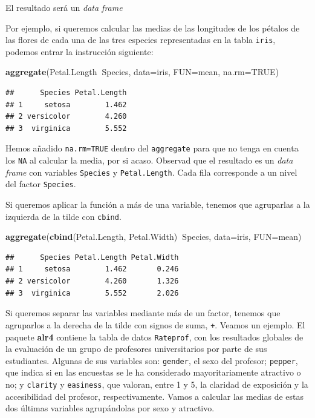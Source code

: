 \documentclass[]{book}
\newenvironment{Shaded}{\begin{snugshade}}{\end{snugshade}}
\newcommand{\DataTypeTok}[1]{\textcolor[rgb]{0.13,0.29,0.53}{#1}}
\newcommand{\KeywordTok}[1]{\textcolor[rgb]{0.13,0.29,0.53}{\textbf{#1}}}
\newcommand{\NormalTok}[1]{#1}
\newcommand{\OperatorTok}[1]{\textcolor[rgb]{0.81,0.36,0.00}{\textbf{#1}}}
\newcommand{\OtherTok}[1]{\textcolor[rgb]{0.56,0.35,0.01}{#1}}
\theoremstyle{definition}
\theoremstyle{definition}
\theoremstyle{definition}
\theoremstyle{remark}
\begin{document}
El resultado será un \emph{data frame}

Por ejemplo, si queremos calcular las medias de las longitudes de los pétalos de las flores de cada una de las tres especies representadas en la tabla \texttt{iris}, podemos entrar la instrucción siguiente:

\begin{Shaded}
\begin{Highlighting}[]
\KeywordTok{aggregate}\NormalTok{(Petal.Length}\OperatorTok{~}\NormalTok{Species, }\DataTypeTok{data=}\NormalTok{iris, }\DataTypeTok{FUN=}\NormalTok{mean, }\DataTypeTok{na.rm=}\OtherTok{TRUE}\NormalTok{)}
\end{Highlighting}
\end{Shaded}

\begin{verbatim}
##      Species Petal.Length
## 1     setosa        1.462
## 2 versicolor        4.260
## 3  virginica        5.552
\end{verbatim}

Hemos añadido \texttt{na.rm=TRUE} dentro del \texttt{aggregate} para que no tenga en cuenta los \texttt{NA} al calcular la media, por si acaso. Observad que el resultado es un \emph{data frame} con variables \texttt{Species} y \texttt{Petal.Length}. Cada fila corresponde a un nivel del factor \texttt{Species}.

Si queremos aplicar la función a más de una variable, tenemos que agruparlas a la izquierda de la tilde con \texttt{cbind}.

\begin{Shaded}
\begin{Highlighting}[]
\KeywordTok{aggregate}\NormalTok{(}\KeywordTok{cbind}\NormalTok{(Petal.Length, Petal.Width)}\OperatorTok{~}\NormalTok{Species, }\DataTypeTok{data=}\NormalTok{iris, }\DataTypeTok{FUN=}\NormalTok{mean)}
\end{Highlighting}
\end{Shaded}

\begin{verbatim}
##      Species Petal.Length Petal.Width
## 1     setosa        1.462       0.246
## 2 versicolor        4.260       1.326
## 3  virginica        5.552       2.026
\end{verbatim}

Si queremos separar las variables mediante más de un factor, tenemos que agruparlos a la derecha de la tilde con signos de suma, \texttt{+}. Veamos un ejemplo. El paquete \textbf{alr4} contiene la tabla de datos \texttt{Rateprof}, con los resultados globales de la evaluación de un grupo de profesores universitarios por parte de sus estudiantes. Algunas de sus variables son: \texttt{gender}, el sexo del profesor; \texttt{pepper}, que indica si en las encuestas se le ha considerado mayoritariamente atractivo o no; y \texttt{clarity} y \texttt{easiness}, que valoran, entre 1 y 5, la claridad de exposición y la accesibilidad del profesor, respectivamente. Vamos a calcular las medias de estas dos últimas variables agrupándolas por sexo y atractivo.
\end{document}
